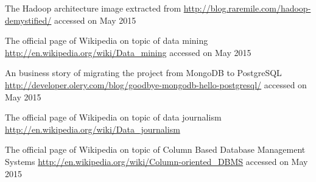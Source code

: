 \begin{thebibliography}{99999}
\singlespace\normalsize

 The Hadoop architecture image extracted from \url{http://blog.raremile.com/hadoop-demystified/} accessed on May 2015

 The official page of Wikipedia on topic of data mining \url{http://en.wikipedia.org/wiki/Data_mining} accessed on May 2015

 An business story of migrating the project from MongoDB to PostgreSQL \url{http://developer.olery.com/blog/goodbye-mongodb-hello-postgresql/} accessed on May 2015

 The official page of Wikipedia on topic of data journalism \url{http://en.wikipedia.org/wiki/Data_journalism}

 The official page of Wikipedia on topic of Column Based Database Management Systems \url{http://en.wikipedia.org/wiki/Column-oriented_DBMS} accessed on May 2015



\end{thebibliography}

